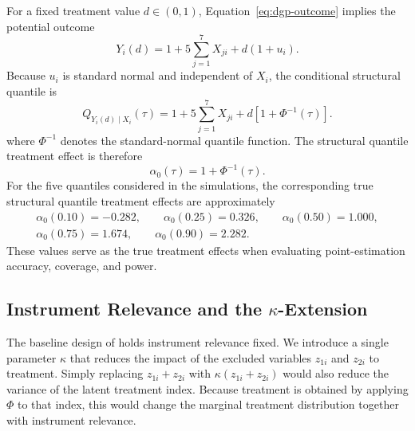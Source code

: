 For a fixed treatment value \(d\in(0,1)\), Equation~\eqref{eq:dgp-outcome} implies the potential outcome
\begin{equation}
  Y_i(d)=1+5\sum_{j=1}^{7}X_{ji}+d(1+u_i).
  \label{eq:dgp-potential-outcome}
\end{equation}
Because \(u_i\) is standard normal and independent of \(X_i\), the conditional structural quantile is
\begin{equation}
  Q_{Y_i(d)\mid X_i}(\tau)
  =1+5\sum_{j=1}^{7}X_{ji}
  +d\left[1+\Phi^{-1}(\tau)\right].
  \label{eq:dgp-structural-quantile}
\end{equation}
where \(\Phi^{-1}\) denotes the standard-normal quantile function. The structural quantile treatment effect is therefore
\begin{equation}
  \alpha_0(\tau)=1+\Phi^{-1}(\tau).
  \label{eq:dgp-alpha-true}
\end{equation}
For the five quantiles considered in the simulations, the corresponding true structural quantile treatment effects are approximately
\[
\begin{gathered}
\alpha_0(0.10)=-0.282,\qquad
\alpha_0(0.25)=0.326,\qquad
\alpha_0(0.50)=1.000,\\
\alpha_0(0.75)=1.674,\qquad
\alpha_0(0.90)=2.282.
\end{gathered}
\]
These values serve as the true treatment effects when evaluating point-estimation accuracy, coverage, and power.

\subsection{Instrument Relevance and the \texorpdfstring{\(\kappa\)}{κ}-Extension}
\label{sec:instrument-relevance-extension}

The baseline design of \textcite{chen_huang_tien_2021} holds instrument relevance fixed. We introduce a single parameter \(\kappa\) that reduces the impact of the excluded variables \(z_{1i}\) and \(z_{2i}\) to treatment. Simply replacing \(z_{1i}+z_{2i}\) with \(\kappa(z_{1i}+z_{2i})\) would also reduce the variance of the latent treatment index. Because treatment is obtained by applying \(\Phi\) to that index, this would change the marginal treatment distribution together with instrument relevance.


